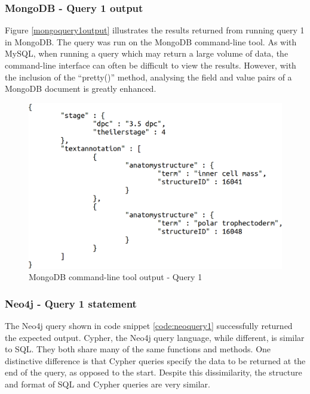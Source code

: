 \subsubsection*{MongoDB - Query 1 output}\label{mongoquery1output}
Figure \ref{mongoquery1output} illustrates the results returned from running query 1 in MongoDB. The query was run on the MongoDB command-line tool. As with MySQL, when running a query which may return a large volume of data, the command-line interface can often be difficult to view the results. However, with the inclusion of the ``pretty()'' method, analysing the field and value pairs of a MongoDB document is greatly enhanced.

\begin{figure}[H]\begin{center}\includegraphics[width=1\linewidth]{images/mongoquery1}\caption{MongoDB command-line tool output - Query 1}\label{fig:mongoquery1}\end{center}\end{figure}

\subsubsection*{Neo4j - Query 1 statement}\label{neoquery1statement}
The Neo4j query shown in code snippet \ref{code:neoquery1} successfully returned the expected output. Cypher, the Neo4j query language, while different, is similar to SQL. They both share many of the same functions and methods. One distinctive difference is that Cypher queries specify the data to be returned at the end of the query, as opposed to the start. Despite this dissimilarity, the structure and format of SQL and Cypher queries are very similar.

